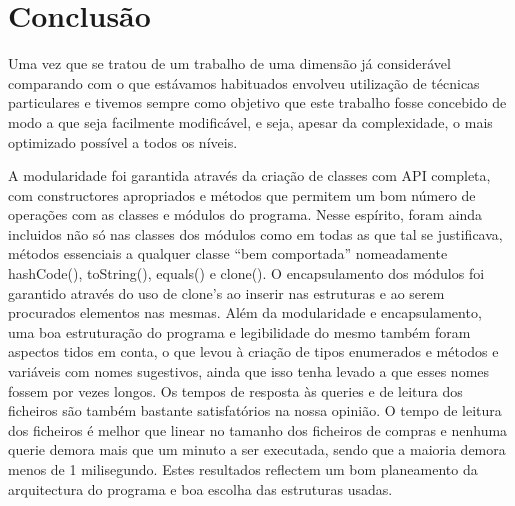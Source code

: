 \chapter{Conclusão}

Uma vez que se tratou de um trabalho de uma dimensão já considerável comparando com o que estávamos habituados envolveu utilização de técnicas particulares e tivemos sempre como objetivo que este trabalho fosse concebido de modo a que seja facilmente modificável, e seja, apesar da complexidade, o mais optimizado possível a todos os níveis.


A modularidade foi garantida através da criação de classes com API completa, com constructores apropriados e métodos que permitem um bom número de operações com as classes e módulos do programa. Nesse espírito, foram ainda incluidos não só nas classes dos módulos como em todas as que tal se justificava, métodos essenciais a qualquer classe “bem comportada” nomeadamente hashCode(), toString(), equals() e clone().
O encapsulamento dos módulos foi garantido através do uso de clone’s ao inserir nas estruturas e ao serem procurados elementos nas mesmas.
Além da modularidade e encapsulamento, uma boa estruturação do programa e legibilidade do mesmo também foram aspectos tidos em conta, o que levou à criação de tipos enumerados e métodos e variáveis com nomes sugestivos, ainda que isso tenha levado a que esses nomes fossem por vezes longos.
Os tempos de resposta às queries e de leitura dos ficheiros são também bastante satisfatórios na nossa opinião. O tempo de leitura dos ficheiros é melhor que linear no tamanho dos ficheiros de compras e nenhuma querie demora mais que um minuto a ser executada, sendo que a maioria demora menos de 1 milisegundo. Estes resultados reflectem um bom planeamento da arquitectura do programa e boa escolha das estruturas usadas.
